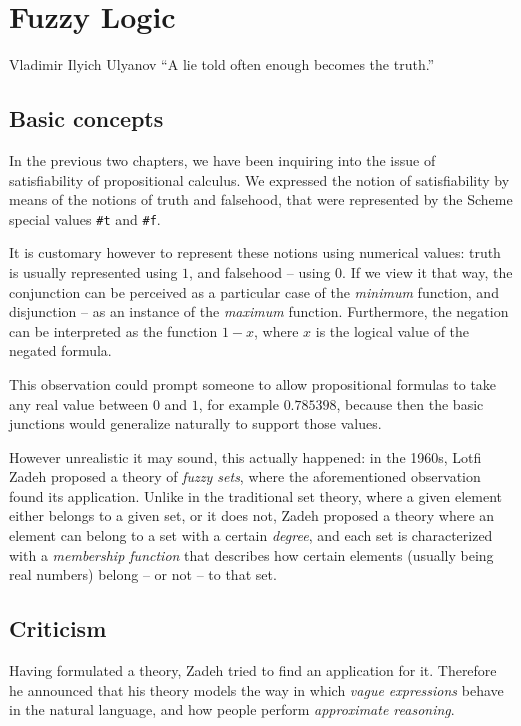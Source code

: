 \chapter{Fuzzy Logic}

\begin{chapquote}{Vladimir Ilyich Ulyanov}
``A lie told often enough becomes the truth.''
\end{chapquote}


\section{Basic concepts}

In the previous two chapters, we have been inquiring into
the issue of satisfiability of propositional calculus.
We expressed the notion of satisfiability by means of the
notions of truth and falsehood, that were represented
by the Scheme special values \texttt{\#t} and \texttt{\#f}.

It is customary however to represent these notions using
numerical values: truth is usually represented using $1$,
and falsehood -- using $0$. If we view it that way, the
conjunction can be perceived as a particular case of the
\textit{minimum} function, and disjunction -- as an
instance of the \textit{maximum} function. Furthermore,
the negation can be interpreted as the function $1-x$, where
$x$ is the logical value of the negated formula.

This observation could prompt someone to allow propositional
formulas to take any real value between $0$ and $1$, for
example $0.785398$, because then the basic junctions would
generalize naturally to support those values.

However unrealistic it may sound, this actually happened:
in the 1960s, Lotfi Zadeh proposed a theory of \textit{fuzzy
sets}, where the aforementioned observation found its
application. Unlike in the traditional set theory, where
a given element either belongs to a given set, or it does
not, Zadeh proposed a theory where an element can belong
to a set with a certain \textit{degree}, and each set
is characterized with a \textit{membership function}
that describes how certain elements (usually being real
numbers) belong -- or not -- to that set.

\section{Criticism}

Having formulated a theory, Zadeh tried to find an application
for it. Therefore he announced that his theory models the way
in which \textit{vague expressions} behave in the natural
language, and how people perform \textit{approximate reasoning}.

